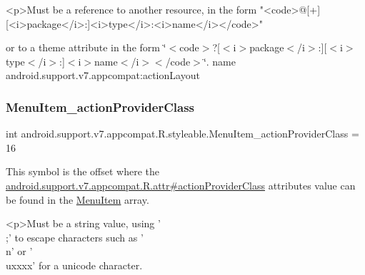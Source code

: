 \begin{DoxyVerb}      <p>Must be a reference to another resource, in the form "<code>@[+][<i>package</i>:]<i>type</i>:<i>name</i></code>"
\end{DoxyVerb}
 or to a theme attribute in the form \char`\"{}$<$code$>$?\mbox{[}$<$i$>$package$<$/i$>$\+:\mbox{]}\mbox{[}$<$i$>$type$<$/i$>$\+:\mbox{]}$<$i$>$name$<$/i$>$$<$/code$>$\char`\"{}.  name android.\+support.\+v7.\+appcompat\+:action\+Layout \mbox{\label{classandroid_1_1support_1_1v7_1_1appcompat_1_1R_1_1styleable_ac073414cb46c8a3e83defa8389f0edf3}} 
\subsubsection{\texorpdfstring{Menu\+Item\+\_\+action\+Provider\+Class}{MenuItem\_actionProviderClass}}
{\footnotesize\ttfamily int android.\+support.\+v7.\+appcompat.\+R.\+styleable.\+Menu\+Item\+\_\+action\+Provider\+Class = 16\hspace{0.3cm}{\ttfamily [static]}}

This symbol is the offset where the \hyperlink{classandroid_1_1support_1_1v7_1_1appcompat_1_1R_1_1attr_a1f37130cb6f2657163219c2ee7e10c99}{android.\+support.\+v7.\+appcompat.\+R.\+attr\#action\+Provider\+Class} attribute\textquotesingle{}s value can be found in the \hyperlink{classandroid_1_1support_1_1v7_1_1appcompat_1_1R_1_1styleable_a3161bf75811c963572105d304c98b088}{Menu\+Item} array.

\begin{DoxyVerb}      <p>Must be a string value, using '\\;' to escape characters such as '\\n' or '\\uxxxx' for a unicode character.
\end{DoxyVerb}
 

